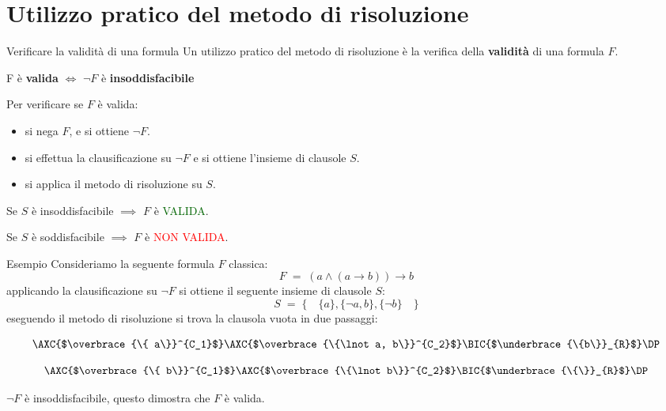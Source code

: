 \documentclass{beamer}
\begin{document}
\section{Utilizzo pratico del metodo di risoluzione}

\begin{frame}{Verificare la validità di una formula}
    Un utilizzo pratico del metodo di risoluzione è la verifica della \textbf{validità} di una formula $F$.
    \begin{center}
        F è \textbf{valida} $\iff$ $\lnot F$ è \textbf{insoddisfacibile}
    \end{center}
    
    Per verificare se $F$ è valida:
    \begin{itemize}
        \item si nega $F$, e si ottiene $\lnot F$.
        \item si effettua la clausificazione su $\lnot F$ e si ottiene l'insieme di clausole $S$.
        \item si applica il metodo di risoluzione su $S$.
    \end{itemize}

    Se $S$ è insoddisfacibile $\implies$ $F$ è \textcolor{darkgreen}{VALIDA}.

    Se $S$ è soddisfacibile $\implies$ $F$ è \textcolor{red}{NON VALIDA}.
\end{frame}

\begin{frame}{Esempio}
    Consideriamo la seguente formula $F$ classica:
    \[
        F \; = \; (a \land (a \to b)) \to b
    \]
    applicando la clausificazione su $\lnot F$ si ottiene il seguente insieme di clausole $S$:
    \[
        S \; = \; \{\quad \{a\}, \{\lnot a, b\}, \{\lnot b\} \quad\}
    \]
    eseguendo il metodo di risoluzione si trova la clausola vuota in due passaggi:
    \begin{center}
        \begin{minipage}{0.45\textwidth}
            \[
                \AXC{$\overbrace{\{ a\}}^{C_1}$}
                \AXC{$\overbrace{\{\lnot a, b\}}^{C_2}$}
                \RightLabel{Res}
                \BIC{$\underbrace{\{b\}}_{R}$}
                \DP
            \]
        \end{minipage}
        \hspace{0.05\textwidth}
        \begin{minipage}{0.45\textwidth}
            \[
                \AXC{$\overbrace{\{ b\}}^{C_1}$}
                \AXC{$\overbrace{\{\lnot b\}}^{C_2}$}
                \RightLabel{Res}
                \BIC{$\underbrace{\{\}}_{R}$}
                \DP
            \]
        \end{minipage}
    \end{center}
    $\lnot F$ è insoddisfacibile, questo dimostra che $F$ è valida.
\end{frame}
\end{document}
